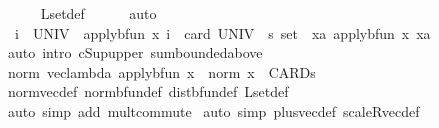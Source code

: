 \begin{isabellebody}
\ \ \ \ \isamarkupfalse%
\ L{}{\isacharunderscore}{\kern0pt}set{\isacharunderscore}{\kern0pt}def\isanewline
\ \ \ \ \isamarkupfalse%
\ auto\isanewline
\ \ \isamarkupfalse%
\ \isamarkupfalse%
\ {\isachardoublequoteopen}{\isacharparenleft}{\kern0pt}{\isasymSum}\ i\ {\isasymin}\ UNIV\ {\isachardot}{\kern0pt}\ {\isasymbar}{\isacharparenleft}{\kern0pt}apply{\isacharunderscore}{\kern0pt}bfun\ x\ i{\isacharparenright}{\kern0pt}{\isasymbar}{\isacharparenright}{\kern0pt}\ {\isasymle}\ {\isacharparenleft}{\kern0pt}card\ {\isacharparenleft}{\kern0pt}UNIV\ {\isacharcolon}{\kern0pt}{\isacharcolon}{\kern0pt}\ {\isacharprime}{\kern0pt}s\ set{\isacharparenright}{\kern0pt}\ {\isacharasterisk}{\kern0pt}\ {\isacharparenleft}{\kern0pt}{\isasymSqunion}xa{\isachardot}{\kern0pt}\ {\isasymbar}apply{\isacharunderscore}{\kern0pt}bfun\ x\ xa{\isasymbar}{\isacharparenright}{\kern0pt}{\isacharparenright}{\kern0pt}{\isachardoublequoteclose}\isanewline
\ \ \ \ \isamarkupfalse%
\ {\isacharparenleft}{\kern0pt}auto\ intro{\isacharbang}{\kern0pt}{\isacharcolon}{\kern0pt}\ cSup{\isacharunderscore}{\kern0pt}upper\ sum{\isacharunderscore}{\kern0pt}bounded{\isacharunderscore}{\kern0pt}above{\isacharparenright}{\kern0pt}\isanewline
\ \ \isamarkupfalse%
\ \isamarkupfalse%
\ {\isachardoublequoteopen}norm\ {\isacharparenleft}{\kern0pt}vec{\isacharunderscore}{\kern0pt}lambda\ {\isacharparenleft}{\kern0pt}apply{\isacharunderscore}{\kern0pt}bfun\ x{\isacharparenright}{\kern0pt}{\isacharparenright}{\kern0pt}\ {\isasymle}\ norm\ x\ {\isacharasterisk}{\kern0pt}\ CARD{\isacharparenleft}{\kern0pt}{\isacharprime}{\kern0pt}s{\isacharparenright}{\kern0pt}{\isachardoublequoteclose}\isanewline
\ \ \ \ \isamarkupfalse%
\ norm{\isacharunderscore}{\kern0pt}vec{\isacharunderscore}{\kern0pt}def\ norm{\isacharunderscore}{\kern0pt}bfun{\isacharunderscore}{\kern0pt}def\ dist{\isacharunderscore}{\kern0pt}bfun{\isacharunderscore}{\kern0pt}def\ L{}{\isacharunderscore}{\kern0pt}set{\isacharunderscore}{\kern0pt}def\isanewline
\ \ \ \ \isamarkupfalse%
\ {\isacharparenleft}{\kern0pt}auto\ simp\ add{\isacharcolon}{\kern0pt}\ mult{\isachardot}{\kern0pt}commute{\isacharparenright}{\kern0pt}\isanewline
{}\isamarkupfalse%
\ {\isacharparenleft}{\kern0pt}auto\ simp{\isacharcolon}{\kern0pt}\ plus{\isacharunderscore}{\kern0pt}vec{\isacharunderscore}{\kern0pt}def\ scaleR{\isacharunderscore}{\kern0pt}vec{\isacharunderscore}{\kern0pt}def{\isacharparenright}{\kern0pt}%

\end{isabellebody}

